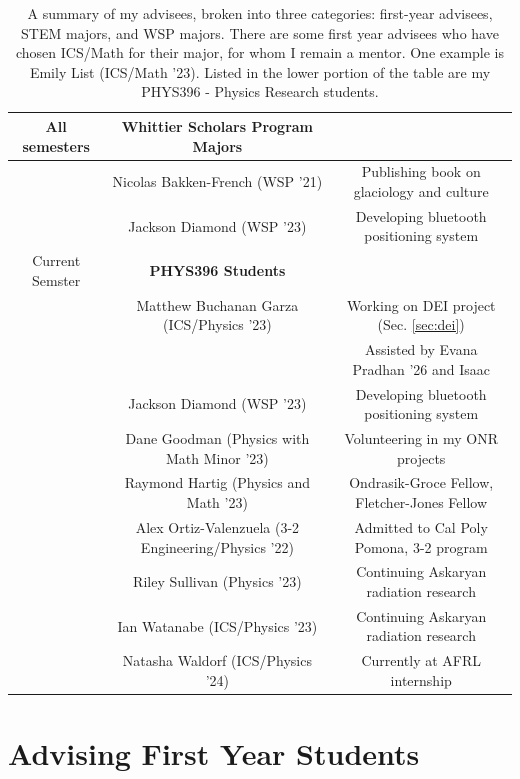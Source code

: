 \documentclass[../../main.tex]{subfiles}
\begin{document}
\begin{table}[ht]
\begin{tabular}{| c | c | c |}
All semesters & \textbf{Whittier Scholars Program Majors} & \\ \hline
& Nicolas Bakken-French (WSP '21) & Publishing book on glaciology and culture \\ \hline
& Jackson Diamond (WSP '23) & Developing bluetooth positioning system \\ \hline \hline
Current Semster & \textbf{PHYS396 Students}  & \\ \hline
& Matthew Buchanan Garza (ICS/Physics '23) & Working on DEI project (Sec. \ref{sec:dei}) \\ & & Assisted by Evana Pradhan '26 and Isaac \\ \hline
& Jackson Diamond (WSP '23) & Developing bluetooth positioning system \\ \hline
& Dane Goodman (Physics with Math Minor '23) & Volunteering in my ONR projects \\ \hline
& Raymond Hartig (Physics and Math '23) & Ondrasik-Groce Fellow, Fletcher-Jones Fellow \\ \hline
& Alex Ortiz-Valenzuela (3-2 Engineering/Physics '22) & Admitted to Cal Poly Pomona, 3-2 program \\ \hline
& Riley Sullivan (Physics '23) & Continuing Askaryan radiation research \\ \hline
& Ian Watanabe (ICS/Physics '23) & Continuing Askaryan radiation research \\ \hline
& Natasha Waldorf (ICS/Physics '24) & Currently at AFRL internship \\ \hline
\end{tabular}
\caption{\label{tab:advisees} A summary of my advisees, broken into three categories: first-year advisees, STEM majors, and WSP majors.  There are some first year advisees who have chosen ICS/Math for their major, for whom I remain a mentor.  One example is Emily List (ICS/Math '23).  Listed in the lower portion of the table are my PHYS396 - Physics Research students.}
\end{table}

\section{Advising First Year Students}
\end{document}
